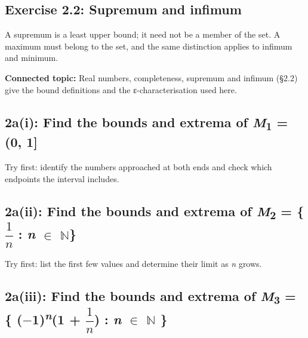 \documentclass[11pt]{article}
\begin{document}
\begin{keepsection}
\section{Exercise 2.2: Supremum and infimum}

A supremum is a least upper bound; it need not be a member of the set. A maximum must belong to the set, and the same distinction applies to infimum and minimum.

\textbf{Connected topic:} Real numbers, completeness, supremum and infimum (§2.2) give the bound definitions and the ε-characterisation used here.

\begin{keepsection}
\subsection{2a(i): Find the bounds and extrema of \textit{M}\textsubscript{1} = (0, 1]}

Try first: identify the numbers approached at both ends and check which endpoints the interval includes.

\end{keepsection}

\begin{keepsection}
\subsection{2a(ii): Find the bounds and extrema of \textit{M}\textsubscript{2} = \{{\small\ensuremath{\dfrac{1}{{n}}}} : \textit{n} \ensuremath{\in} \ensuremath{\mathbb{N}}\}}

Try first: list the first few values and determine their limit as \textit{n} grows.

\end{keepsection}

\begin{keepsection}
\subsection{2a(iii): Find the bounds and extrema of \textit{M}\textsubscript{3} = \{ (\ensuremath{-}1)\textsuperscript{\textit{n}}(1 + {\small\ensuremath{\dfrac{1}{{n}}}}) : \textit{n} \ensuremath{\in} \ensuremath{\mathbb{N}} \}}


\end{keepsection}
\end{keepsection}
\end{document}
